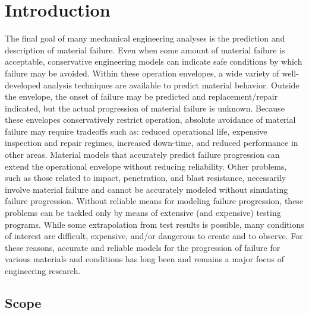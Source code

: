 \chapter{Introduction}

The final goal of many mechanical engineering analyses is the prediction and description of material failure.
Even when some amount of material failure is acceptable, conservative engineering models can indicate safe conditions by which failure may be avoided.
Within these operation envelopes, a wide variety of well-developed analysis techniques are available to predict material behavior.
Outside the envelope, the onset of failure may be predicted and replacement/repair indicated, but the actual progression of material failure is unknown.
Because these envelopes conservatively restrict operation, absolute avoidance of material failure may require tradeoffs such as: reduced operational life, expensive inspection and repair regimes, increased down-time, and reduced performance in other areas.
Material models that accurately predict failure progression can extend the operational envelope without reducing reliability.
Other problems, such as those related to impact, penetration, and blast resistance, necessarily involve material failure and cannot be accurately modeled without simulating failure progression.
Without reliable means for modeling failure progression, these problems can be tackled only by means of extensive (and expensive) testing programs.
While some extrapolation from test results is possible, many conditions of interest are difficult, expensive, and/or dangerous to create and to observe.
For these reasons, accurate and reliable models for the progression of failure for various materials and conditions has long been and remains a major focus of engineering research.


\section{Scope}

